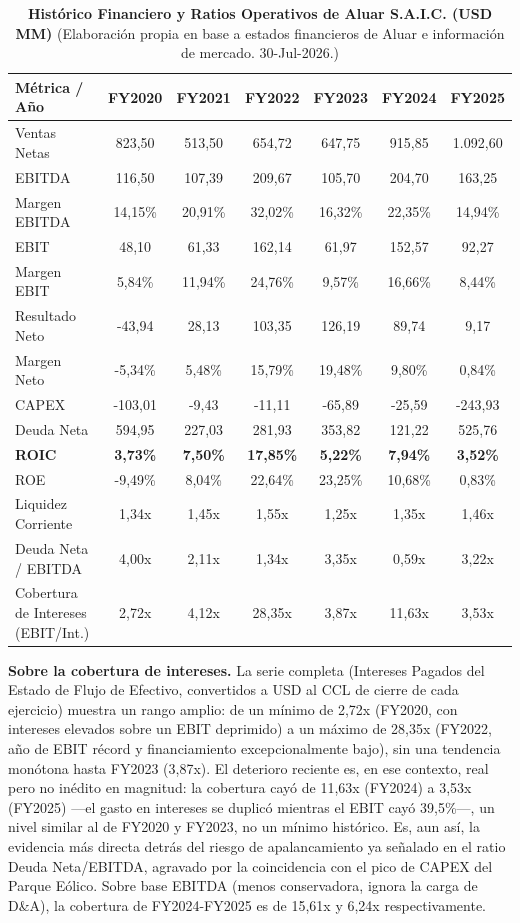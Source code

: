 \documentclass[10pt,a4paper]{article}
\begin{document}
\begin{table}[H]
\centering
\caption{\textbf{Histórico Financiero y Ratios Operativos de Aluar S.A.I.C. (USD MM)} {\small\color{gsgray} (Elaboración propia en base a estados financieros de Aluar e información de mercado. 30-Jul-2026.)}}
\scriptsize
\begin{tabular}{lcccccc}
\toprule
\textbf{Métrica / Año} & \textbf{FY2020} & \textbf{FY2021} & \textbf{FY2022} & \textbf{FY2023} & \textbf{FY2024} & \textbf{FY2025} \\
\midrule
Ventas Netas & 823,50 & 513,50 & 654,72 & 647,75 & 915,85 & 1.092,60 \\
EBITDA & 116,50 & 107,39 & 209,67 & 105,70 & 204,70 & 163,25 \\
Margen EBITDA & 14,15\% & 20,91\% & 32,02\% & 16,32\% & 22,35\% & 14,94\% \\
EBIT & 48,10 & 61,33 & 162,14 & 61,97 & 152,57 & 92,27 \\
Margen EBIT & 5,84\% & 11,94\% & 24,76\% & 9,57\% & 16,66\% & 8,44\% \\
Resultado Neto & -43,94 & 28,13 & 103,35 & 126,19 & 89,74 & 9,17 \\
Margen Neto & -5,34\% & 5,48\% & 15,79\% & 19,48\% & 9,80\% & 0,84\% \\
CAPEX & -103,01 & -9,43 & -11,11 & -65,89 & -25,59 & -243,93 \\
Deuda Neta & 594,95 & 227,03 & 281,93 & 353,82 & 121,22 & 525,76 \\
\midrule
\textbf{ROIC} & \textbf{3,73\%} & \textbf{7,50\%} & \textbf{17,85\%} & \textbf{5,22\%} & \textbf{7,94\%} & \textbf{3,52\%} \\
ROE & -9,49\% & 8,04\% & 22,64\% & 23,25\% & 10,68\% & 0,83\% \\
Liquidez Corriente & 1,34x & 1,45x & 1,55x & 1,25x & 1,35x & 1,46x \\
Deuda Neta / EBITDA & 4,00x & 2,11x & 1,34x & 3,35x & 0,59x & 3,22x \\
Cobertura de Intereses (EBIT/Int.) & 2,72x & 4,12x & 28,35x & 3,87x & 11,63x & 3,53x \\
\bottomrule
\end{tabular}
\end{table}

\textbf{Sobre la cobertura de intereses.} La serie completa (Intereses Pagados del Estado de Flujo de Efectivo, convertidos a USD al CCL de cierre de cada ejercicio) muestra un rango amplio: de un mínimo de 2,72x (FY2020, con intereses elevados sobre un EBIT deprimido) a un máximo de 28,35x (FY2022, año de EBIT récord y financiamiento excepcionalmente bajo), sin una tendencia monótona hasta FY2023 (3,87x). El deterioro reciente es, en ese contexto, real pero no inédito en magnitud: la cobertura cayó de 11,63x (FY2024) a 3,53x (FY2025) —el gasto en intereses se duplicó mientras el EBIT cayó 39,5\%—, un nivel similar al de FY2020 y FY2023, no un mínimo histórico. Es, aun así, la evidencia más directa detrás del riesgo de apalancamiento ya señalado en el ratio Deuda Neta/EBITDA, agravado por la coincidencia con el pico de CAPEX del Parque Eólico. Sobre base EBITDA (menos conservadora, ignora la carga de D\&A), la cobertura de FY2024-FY2025 es de 15,61x y 6,24x respectivamente.
\end{document}
